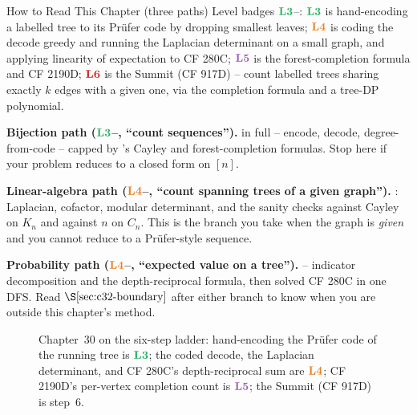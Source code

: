 \begin{chaptertheorybox}{How to Read This Chapter (three paths)}
Level badges \(\lv3\)--: \(\lv3\) is hand-encoding a labelled tree to its
Pr\"ufer code by dropping smallest leaves; \(\lv4\) is coding the decode
greedy and running the Laplacian determinant on a small graph, and applying
linearity of expectation to CF 280C; \(\lv5\) is the forest-completion formula
and CF 2190D; \(\lv6\) is the Summit (CF 917D) -- count labelled trees sharing
exactly \(k\) edges with a given one, via the completion formula and a
tree-DP polynomial.

\textbf{Bijection path (\(\lv3\)--, ``count sequences'').}
 in full -- encode, decode, degree-from-code -- capped by
's Cayley and forest-completion formulas.  Stop here if
your problem reduces to a closed form on \([n]\).

\textbf{Linear-algebra path (\(\lv4\)--, ``count spanning trees of a
given graph'').} : Laplacian, cofactor, modular determinant,
and the sanity checks against Cayley on \(K_n\) and against \(n\) on \(C_n\).
This is the branch you take when the graph is \emph{given} and you cannot
reduce to a Pr\"ufer-style sequence.

\textbf{Probability path (\(\lv4\)--, ``expected value on a tree'').}
 -- indicator decomposition and the depth-reciprocal
formula, then solved CF 280C in one DFS.  Read \(\secref{c32-boundary}\) after
either branch to know when you are outside this chapter's method.
\end{chaptertheorybox}

\begin{figure}[H]
\centering
{}
\caption{Chapter~30 on the six-step ladder: hand-encoding the Pr\"ufer code
of the running tree is \(\lv3\); the coded decode, the Laplacian determinant,
and CF 280C's depth-reciprocal sum are \(\lv4\); CF 2190D's
per-vertex completion count is \(\lv5\); the Summit (CF 917D) is step~6.}
\end{figure}

